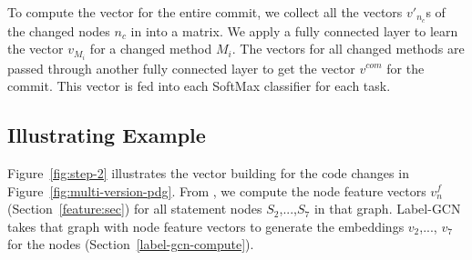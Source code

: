 To compute the vector for the entire commit, we collect all
the vectors $v{'}_{n_c}$s of the changed nodes $n_c$ in {\mvpdgxy}
into a matrix. We apply a fully connected layer to learn
the vector $v_{M_i}$ for a changed method $M_i$. The vectors for all changed
methods are passed through another fully connected layer to get the
vector $v^{com}$ for the commit. This vector is fed
into each SoftMax classifier for each task.


\subsection{Illustrating Example}

Figure~\ref{fig:step-2} illustrates the vector building for the code
changes in Figure~\ref{fig:multi-version-pdg}. From
{\mvpdgxy}, we compute the node feature vectors $v^{f}_n$
(Section~\ref{feature:sec}) for all statement nodes $S_2$,...,$S_7$ in
that graph. Label-GCN takes that graph with node feature vectors to
generate the embeddings $v_2$,..., $v_7$ for the nodes
(Section~\ref{label-gcn-compute}).


